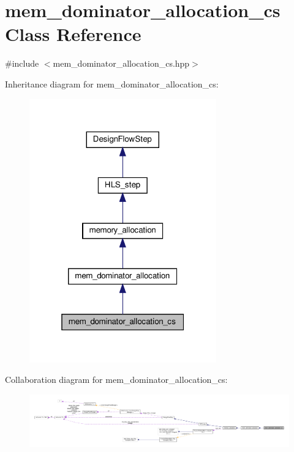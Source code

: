 \hypertarget{classmem__dominator__allocation__cs}{}\section{mem\+\_\+dominator\+\_\+allocation\+\_\+cs Class Reference}
\label{classmem__dominator__allocation__cs}


{\ttfamily \#include $<$mem\+\_\+dominator\+\_\+allocation\+\_\+cs.\+hpp$>$}



Inheritance diagram for mem\+\_\+dominator\+\_\+allocation\+\_\+cs\+:
\nopagebreak
\begin{figure}[H]
\begin{center}
\leavevmode
\includegraphics[width=229pt]{dc/d71/classmem__dominator__allocation__cs__inherit__graph}
\end{center}
\end{figure}


Collaboration diagram for mem\+\_\+dominator\+\_\+allocation\+\_\+cs\+:
\nopagebreak
\begin{figure}[H]
\begin{center}
\leavevmode
\includegraphics[width=350pt]{d5/d82/classmem__dominator__allocation__cs__coll__graph}
\end{center}
\end{figure}
